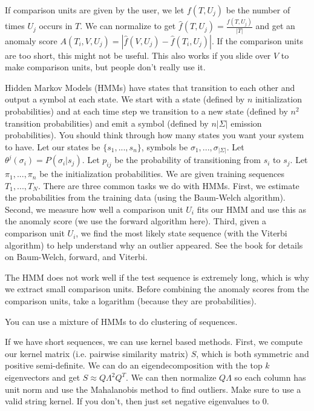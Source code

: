 \documentclass[a4paper]{article}
\begin{document}
If comparison units are given by the user, we let $f(T, U_j)$ be the number of
times $U_j$ occurs in $T$. We can normalize to get $\hat{f}(T, U_j) =
\frac{f(T, U_j)}{|T|}$ and get an anomaly score $A(T_i, V, U_j) = |\hat{f}(V, U_j)
- \hat{f}(T_i, U_j)|$. If the comparison units are too short, this might not
be useful. This also works if you slide over $V$ to make comparison units,
but people don't really use it.

Hidden Markov Models (HMMs) have states that transition to each other and output
a symbol at each state. We start with a state (defined by $n$ initialization
probabilities) and at each time step we transition to a new state (defined
by $n^2$ transition probabilities) and emit a symbol (defined by $n |\Sigma|$
emission probabilities). You should think through how many states you want
your system to have. Let our states be $\{s_1, ..., s_n\}$, symbols be $
\sigma_1, ..., \sigma_{|\Sigma|}$. Let $\theta^{j}(\sigma_i) = P(\sigma_i | s_j)
$. Let $p_{ij}$ be the probability of transitioning from $s_i$ to $s_j$. Let
$\pi_1, ..., \pi_n$ be the initialization probabilities. We are given training
sequences $T_1, ..., T_N$. There are three common tasks we do with HMMs. First,
we estimate the probabilities from the training data (using the Baum-Welch
algorithm). Second, we measure how well a comparison unit $U_i$ fits our HMM
and use this as the anomaly score (we use the forward algorithm here). Third,
given a comparison unit $U_i$, we find the most likely state sequence (with
the Viterbi algorithm) to help
understand why an outlier appeared. See the book for details on Baum-Welch,
forward, and Viterbi.

The HMM does not work well if the test sequence is extremely long, which is why
we extract small comparison units. Before combining the anomaly scores from
the comparison units, take a logarithm (because they are probabilities).

You can use a mixture of HMMs to do clustering of sequences.

If we have short sequences, we can use kernel based methods. First, we
compute our kernel matrix (i.e. pairwise similarity matrix) $S$, which is
both symmetric and positive semi-definite. We can
do an eigendecomposition with the top $k$ eigenvectors and get $S \approx
Q \Lambda^2 Q^T$. We can then normalize $Q \Lambda$ so each column has unit
norm and use the Mahalanobis method to find outliers. Make sure to use a valid
string kernel. If you don't, then just set negative eigenvalues to 0.
\end{document}
